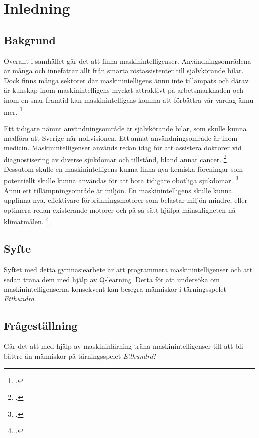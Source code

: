 \documentclass[12pt,a4paper]{article}
\begin{document}
  \cleardoublepage

  \thispagestyle{empty} 
  \tableofcontents 

  \cleardoublepage


  \section{Inledning}\label{sec:inledning}
    \subsection{Bakgrund}\label{subsec:bakgrund} 
      Överallt i samhället går det att finna maskinintelligenser. Användningsområdena är många och innefattar allt från smarta röstassistenter till självkörande bilar. Dock finns många sektorer där maskinintelligens ännu inte tillämpats och därav är kunskap inom maskinintelligens mycket attraktivt på arbetsmarknaden och inom en snar framtid kan maskinintelligens komma att förbättra vår vardag ännu mer. \footcite{ref:stackoverflowai}

      Ett tidigare nämnt användningsområde är självkörande bilar, som skulle kunna medföra att Sverige når nollvisionen. Ett annat användningsområde är inom medicin. Maskinintelligenser används redan idag för att assistera doktorer vid diagnostisering av diverse sjukdomar och tillstånd, bland annat cancer. \footcite{ref:cancer} Dessutom skulle en maskinintelligens kunna finna nya kemiska föreningar som potentiellt skulle kunna användas för att bota tidigare obotliga sjukdomar. \footcite{ref:antibiotika} Ännu ett tillämpningsområde är miljön. En maskinintelligens skulle kunna uppfinna nya, effektivare förbränningsmotorer som belastar miljön mindre, eller optimera redan existerande motorer och på så sätt hjälpa mänskligheten nå klimatmålen. \footcite{ref:motorer}

    \subsection{Syfte}\label{subsec:syfte} 
      Syftet med detta gymnasiearbete är att programmera maskinintelligenser och att sedan träna dem med hjälp av Q-learning. Detta för att undersöka om maskinintelligenserna konsekvent kan besegra människor i tärningsspelet \emph{Etthundra}.

    \subsection{Frågeställning}\label{subsec:fragestallning} 
      Går det att med hjälp av maskininlärning träna maskinintelligenser till att bli bättre än människor på tärningsspelet \emph{Etthundra}?
\end{document}
